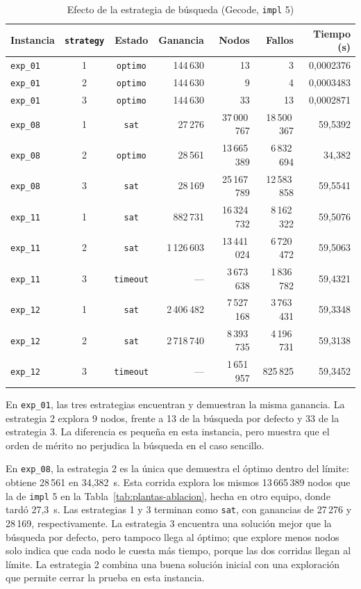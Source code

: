 \begin{table}[htbp]
    \caption{Efecto de la estrategia de búsqueda (Gecode, \texttt{impl} 5)}
    \label{tab:plantas-estrategias}
    \small
    \begin{tabular}{@{}lccrrrr@{}}
        \toprule
        Instancia & \texttt{strategy} & Estado & Ganancia & Nodos & Fallos & Tiempo (s) \\
        \midrule
        \texttt{exp\_01} & 1 & \texttt{optimo} & 144\,630 & 13 & 3 & 0,0002376 \\
        \texttt{exp\_01} & 2 & \texttt{optimo} & 144\,630 & 9 & 4 & 0,0003483 \\
        \texttt{exp\_01} & 3 & \texttt{optimo} & 144\,630 & 33 & 13 & 0,0002871 \\
        \texttt{exp\_08} & 1 & \texttt{sat} & 27\,276 & 37\,000\,767 & 18\,500\,367 & 59,5392 \\
        \texttt{exp\_08} & 2 & \texttt{optimo} & 28\,561 & 13\,665\,389 & 6\,832\,694 & 34,382 \\
        \texttt{exp\_08} & 3 & \texttt{sat} & 28\,169 & 25\,167\,789 & 12\,583\,858 & 59,5541 \\
        \texttt{exp\_11} & 1 & \texttt{sat} & 882\,731 & 16\,324\,732 & 8\,162\,322 & 59,5076 \\
        \texttt{exp\_11} & 2 & \texttt{sat} & 1\,126\,603 & 13\,441\,024 & 6\,720\,472 & 59,5063 \\
        \texttt{exp\_11} & 3 & \texttt{timeout} & --- & 3\,673\,638 & 1\,836\,782 & 59,4321 \\
        \texttt{exp\_12} & 1 & \texttt{sat} & 2\,406\,482 & 7\,527\,168 & 3\,763\,431 & 59,3348 \\
        \texttt{exp\_12} & 2 & \texttt{sat} & 2\,718\,740 & 8\,393\,735 & 4\,196\,731 & 59,3138 \\
        \texttt{exp\_12} & 3 & \texttt{timeout} & --- & 1\,651\,957 & 825\,825 & 59,3452 \\
        \bottomrule
    \end{tabular}
\end{table}

En \texttt{exp\_01}, las tres estrategias encuentran y demuestran la misma ganancia. La estrategia 2 explora 9 nodos, frente a 13 de la búsqueda por defecto y 33 de la estrategia 3. La diferencia es pequeña en esta instancia, pero muestra que el orden de mérito no perjudica la búsqueda en el caso sencillo.

En \texttt{exp\_08}, la estrategia 2 es la única que demuestra el óptimo dentro del límite: obtiene 28\,561 en 34,382~s. Esta corrida explora los mismos 13\,665\,389 nodos que la de \texttt{impl} 5 en la Tabla~\ref{tab:plantas-ablacion}, hecha en otro equipo, donde tardó 27,3~s. Las estrategias 1 y 3 terminan como \texttt{sat}, con ganancias de 27\,276 y 28\,169, respectivamente. La estrategia 3 encuentra una solución mejor que la búsqueda por defecto, pero tampoco llega al óptimo; que explore menos nodos solo indica que cada nodo le cuesta más tiempo, porque las dos corridas llegan al límite. La estrategia 2 combina una buena solución inicial con una exploración que permite cerrar la prueba en esta instancia.

